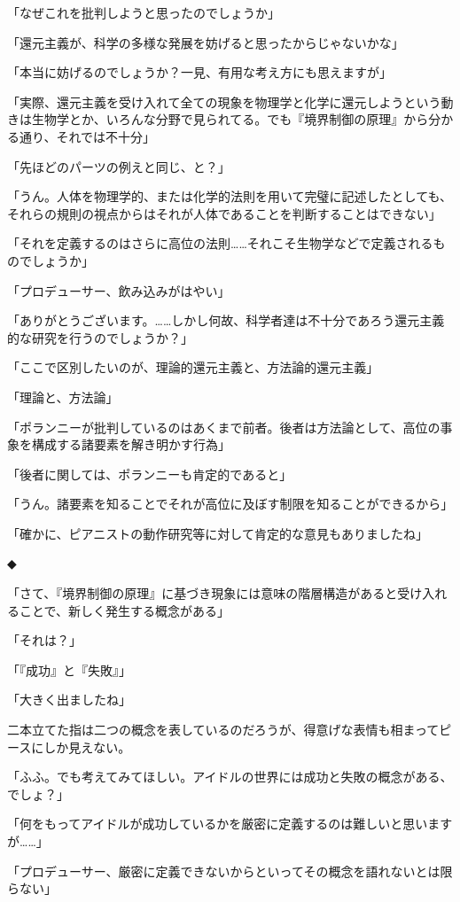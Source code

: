 \documentclass[paper=b5j]{jlreq}
\begin{document}
「なぜこれを批判しようと思ったのでしょうか」

「還元主義が、科学の多様な発展を妨げると思ったからじゃないかな」

「本当に妨げるのでしょうか？一見、有用な考え方にも思えますが」

「実際、還元主義を受け入れて全ての現象を物理学と化学に還元しようという動きは生物学とか、いろんな分野で見られてる。でも『境界制御の原理』から分かる通り、それでは不十分」

「先ほどのパーツの例えと同じ、と？」

「うん。人体を物理学的、または化学的法則を用いて完璧に記述したとしても、それらの規則の視点からはそれが人体であることを判断することはできない」

「それを定義するのはさらに高位の法則……それこそ生物学などで定義されるものでしょうか」

「プロデューサー、飲み込みがはやい」

「ありがとうございます。……しかし何故、科学者達は不十分であろう還元主義的な研究を行うのでしょうか？」

「ここで区別したいのが、理論的還元主義と、方法論的還元主義\cite{reductionism}」

「理論と、方法論」

「ポランニーが批判しているのはあくまで前者。後者は方法論として、高位の事象を構成する諸要素を解き明かす行為」

「後者に関しては、ポランニーも肯定的であると」

「うん。諸要素を知ることでそれが高位に及ぼす制限を知ることができるから」

「確かに、ピアニストの動作研究等に対して肯定的な意見もありましたね」

◆


「さて、『境界制御の原理』に基づき現象には意味の階層構造があると受け入れることで、新しく発生する概念がある」

「それは？」

「『成功』と『失敗』」\cite[79]{polanyi1966ja}

「大きく出ましたね」


二本立てた指は二つの概念を表しているのだろうが、得意げな表情も相まってピースにしか見えない。

「ふふ。でも考えてみてほしい。アイドルの世界には成功と失敗の概念がある、でしょ？」

「何をもってアイドルが成功しているかを厳密に定義するのは難しいと思いますが……」

「プロデューサー、厳密に定義できないからといってその概念を語れないとは限らない」
\end{document}
